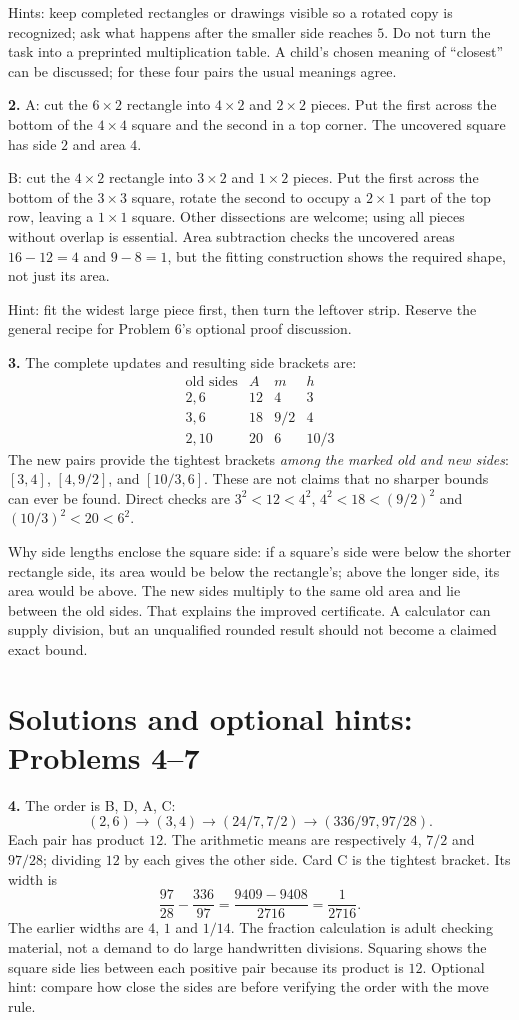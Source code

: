 \documentclass[11pt,letterpaper]{article}
\begin{document}
Hints: keep completed rectangles or drawings visible so a rotated copy is recognized; ask what happens after the smaller side reaches $5$. Do not turn the task into a preprinted multiplication table. A child's chosen meaning of ``closest'' can be discussed; for these four pairs the usual meanings agree.

\textbf{2.} A: cut the $6\times2$ rectangle into $4\times2$ and $2\times2$ pieces. Put the first across the bottom of the $4\times4$ square and the second in a top corner. The uncovered square has side $2$ and area $4$.

B: cut the $4\times2$ rectangle into $3\times2$ and $1\times2$ pieces. Put the first across the bottom of the $3\times3$ square, rotate the second to occupy a $2\times1$ part of the top row, leaving a $1\times1$ square. Other dissections are welcome; using all pieces without overlap is essential. Area subtraction checks the uncovered areas $16-12=4$ and $9-8=1$, but the fitting construction shows the required shape, not just its area.

Hint: fit the widest large piece first, then turn the leftover strip. Reserve the general recipe for Problem 6's optional proof discussion.

\textbf{3.} The complete updates and resulting side brackets are:
\[
\begin{array}{c|c|c|c}
\text{old sides}&A&m&h\\\hline
2,6&12&4&3\\
3,6&18&9/2&4\\
2,10&20&6&10/3
\end{array}
\]
The new pairs provide the tightest brackets \emph{among the marked old and new sides}: $[3,4]$, $[4,9/2]$, and $[10/3,6]$. These are not claims that no sharper bounds can ever be found. Direct checks are $3^2<12<4^2$, $4^2<18<(9/2)^2$ and $(10/3)^2<20<6^2$.

Why side lengths enclose the square side: if a square's side were below the shorter rectangle side, its area would be below the rectangle's; above the longer side, its area would be above. The new sides multiply to the same old area and lie between the old sides. That explains the improved certificate. A calculator can supply division, but an unqualified rounded result should not become a claimed exact bound.
\newpage
\section*{Solutions and optional hints: Problems 4--7}
\textbf{4.} The order is B, D, A, C:
\[(2,6)\to(3,4)\to(24/7,7/2)\to(336/97,97/28).\]
Each pair has product $12$. The arithmetic means are respectively $4$, $7/2$ and $97/28$; dividing $12$ by each gives the other side. Card C is the tightest bracket. Its width is
\[\frac{97}{28}-\frac{336}{97}=\frac{9409-9408}{2716}=\frac1{2716}.\]
The earlier widths are $4$, $1$ and $1/14$. The fraction calculation is adult checking material, not a demand to do large handwritten divisions. Squaring shows the square side lies between each positive pair because its product is $12$. Optional hint: compare how close the sides are before verifying the order with the move rule.
\end{document}
